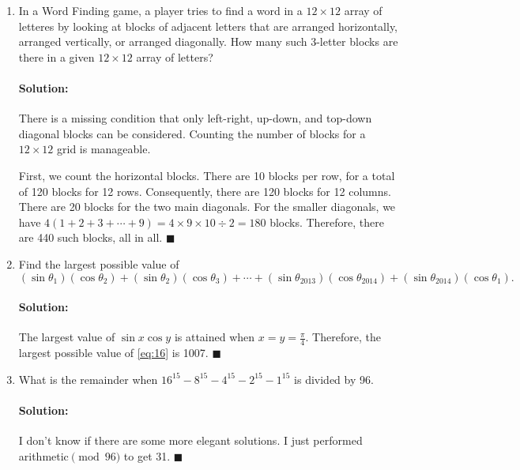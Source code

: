 \documentclass{article}
\newenvironment{solution}{\paragraph{Solution:}}{\hfill$\blacksquare$}
\begin{document}
\begin{enumerate}
	\begin{solution}
		The only possible combinations of numbers of marbles are: 6, 1, 0; 5, 2, 0; 4, 3, 0; and 4, 2, 1. Each of these combinations are permuted 3! times. Therefore, there are $4\times 3!=24$ ways that Alex, Billy and Charles can split the 7 identical marbles.
	\end{solution}

	\item In a Word Finding game, a player tries to find a word in a $12\times 12$ array of letteres by looking at blocks of adjacent letters that are arranged horizontally, arranged vertically, or arranged diagonally. How many such 3-letter blocks are there in a given $12\times 12$ array of letters?
	
	\begin{solution}
		There is a missing condition that only left-right, up-down, and top-down diagonal blocks can be considered. Counting the number of blocks for a $12\times 12$ grid is manageable. 
		\begin{center}
		\end{center}
		First, we count the horizontal blocks. There are 10 blocks per row, for a total of 120 blocks for 12 rows. Consequently, there are 120 blocks for 12 columns. There are 20 blocks for the two main diagonals. For the smaller diagonals, we have $4(1+2+3+\cdots+9)=4\times 9\times 10\div 2=180$ blocks. Therefore, there are 440 such blocks, all in all.
	\end{solution}

	\item Find the largest possible value of 
	\begin{equation}
		(\sin\theta_1)(\cos\theta_2)+(\sin\theta_2)(\cos\theta_3)+\cdots+(\sin\theta_{2013})(\cos\theta_{2014})+(\sin\theta_{2014})(\cos\theta_1).\label{eq:16}
	\end{equation}
	\begin{solution}
		The largest value of $\sin x\cos y$ is attained when $x=y=\frac{\pi}{4}$. Therefore, the largest possible value of \eqref{eq:16} is 1007.
	\end{solution}

	\item What is the remainder when $16^{15}-8^{15}-4^{15}-2^{15}-1^{15}$ is divided by 96.
	\begin{solution}
		I don't know if there are some more elegant solutions. I just performed arithmetic$\pmod{96}$ to get 31.
	\end{solution}


\end{enumerate}
\end{document}

